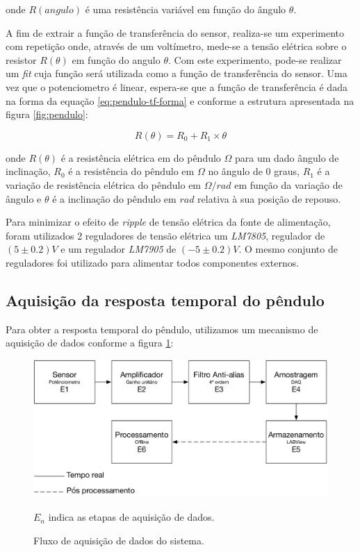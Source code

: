 \documentclass[12pt,a4paper]{instrumentacao}
\begin{document}
onde $R(angulo)$ é uma resistência variável em função do ângulo $\theta$.

A fim de extrair a função de transferência do sensor, realiza-se um experimento com repetição onde, através de um voltímetro, mede-se a tensão elétrica sobre o resistor $R(\theta)$ em função do angulo $\theta$. Com este experimento, pode-se realizar um \textit{fit} cuja função será utilizada como a função de transferência do sensor. Uma vez que o potenciometro é linear, espera-se que a função de transferência é dada na forma da equação \ref{eq:pendulo-tf-forma} e conforme a estrutura apresentada na figura \ref{fig:pendulo}:

\begin{equation}
	R(\theta) = R_0 + R_1 \times \theta
	\label{eq:pendulo-tf-forma}
\end{equation}

onde $R(\theta)$ é a resistência elétrica em do pêndulo $\Omega$ para um dado ângulo de inclinação, $R_0$ é a resistência do pêndulo em $\Omega$ no ângulo de 0 graus, $R_1$ é a variação de resistência elétrica do pêndulo em $\Omega / rad$ em função da variação de ângulo e $\theta$ é a inclinação do pêndulo em $rad$ relativa à sua posição de repouso.

Para minimizar o efeito de \textit{ripple} de tensão elétrica da fonte de alimentação, foram utilizados 2 reguladores de tensão elétrica um \textit{LM7805}, regulador de $(5 \pm 0.2)V$\cite{datasheet-lm7805} e um regulador \textit{LM7905} de $(-5 \pm 0.2)V$\cite{datasheet-lm7905}. O mesmo conjunto de reguladores foi utilizado para alimentar todos componentes externos.

\subsection{Aquisição da resposta temporal do pêndulo}

Para obter a resposta temporal do pêndulo, utilizamos um mecanismo de aquisição de dados conforme a figura \ref{fig:pendulo-fluxo-medidas}:

\begin{figure}[H]
\centering
\includegraphics[width=\textwidth]{Pendulo-Fluxograma.pdf}
\caption{Fluxo de aquisição de dados do sistema.}
$E_n$ indica as etapas de aquisição de dados.
\label{fig:pendulo-fluxo-medidas}
\end{figure}
\end{document}
